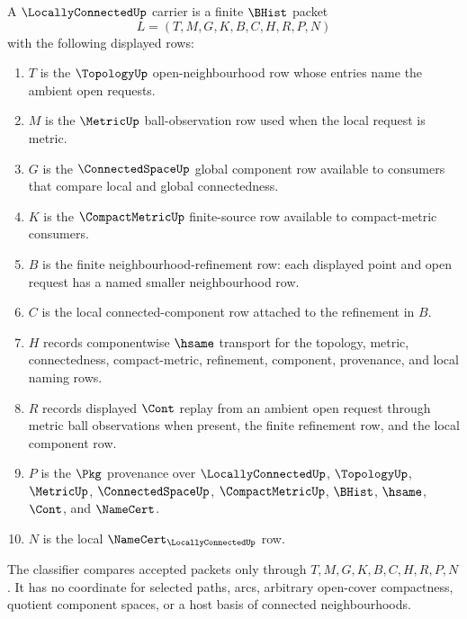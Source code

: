 \begin{definition}
\label{def:locally-connected-carrier}
A $\LocallyConnectedUp$ carrier is a finite $\BHist$ packet
$$
L=(T,M,G,K,B,C,H,R,P,N)
$$
with the following displayed rows:
\begin{enumerate}
\item $T$ is the $\TopologyUp$ open-neighbourhood row whose entries name the ambient open requests.
\item $M$ is the $\MetricUp$ ball-observation row used when the local request is metric.
\item $G$ is the $\ConnectedSpaceUp$ global component row available to consumers that compare local and global connectedness.
\item $K$ is the $\CompactMetricUp$ finite-source row available to compact-metric consumers.
\item $B$ is the finite neighbourhood-refinement row: each displayed point and open request has a named smaller neighbourhood row.
\item $C$ is the local connected-component row attached to the refinement in $B$.
\item $H$ records componentwise $\hsame$ transport for the topology, metric, connectedness, compact-metric, refinement, component, provenance, and local naming rows.
\item $R$ records displayed $\Cont$ replay from an ambient open request through metric ball observations when present, the finite refinement row, and the local component row.
\item $P$ is the $\Pkg$ provenance over $\LocallyConnectedUp$, $\TopologyUp$, $\MetricUp$, $\ConnectedSpaceUp$, $\CompactMetricUp$, $\BHist$, $\hsame$, $\Cont$, and $\NameCert$.
\item $N$ is the local $\NameCert_{\LocallyConnectedUp}$ row.
\end{enumerate}
The classifier compares accepted packets only through $T,M,G,K,B,C,H,R,P,N$. It has no coordinate for selected paths, arcs, arbitrary open-cover compactness, quotient component spaces, or a host basis of connected neighbourhoods.
\end{definition}

